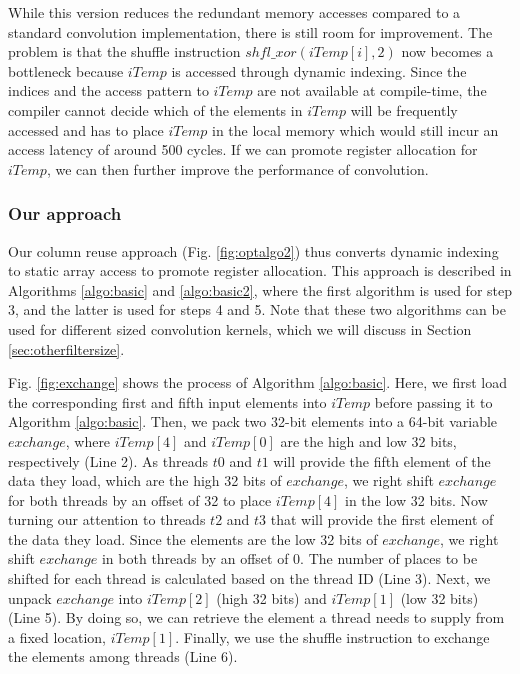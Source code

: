 While this version reduces the redundant memory accesses compared to a standard convolution implementation, there is still room for improvement.
The problem is that the shuffle instruction $shfl\_xor(iTemp[i],2)$ now becomes a bottleneck because $iTemp$ is accessed through dynamic indexing.
Since the indices and the access pattern to $iTemp$ are not available at compile-time, the compiler cannot decide which of the elements in $iTemp$ will be frequently accessed and has to place $iTemp$ in the local memory which would still incur an access latency of around 500 cycles.
If we can promote register allocation for $iTemp$, we can then further improve the performance of convolution.

\subsubsection{Our approach}
\label{sec:columnreuse}
Our column reuse approach (Fig. \ref {fig:optalgo2}) thus converts dynamic indexing to static array access to promote register
allocation. This approach is described in Algorithms \ref{algo:basic} and \ref{algo:basic2}, where the first algorithm is used for step 3,
and the latter is used for steps 4 and 5. Note that these two algorithms can be used for different sized convolution kernels, which we
will discuss in Section \ref {sec:otherfiltersize}.

Fig. \ref{fig:exchange} shows the process of Algorithm \ref{algo:basic}. Here, we first load the corresponding first and fifth input
elements into $iTemp$ before passing it to Algorithm \ref{algo:basic}. Then, we pack two 32-bit elements into a 64-bit variable $exchange$,
where $iTemp[4]$ and $iTemp[0]$ are the high and low 32 bits, respectively (Line 2). As threads $t0$ and $t1$ will provide the fifth
element of the data they load, which are the high 32 bits of $exchange$, we right shift $exchange$ for both threads by an offset of 32 to
place $iTemp[4]$ in the low 32 bits. Now turning our attention to threads $t2$ and $t3$ that will provide the first element of the data
they load. Since the elements are the low 32 bits of $exchange$, we right shift $exchange$ in both threads by an offset of 0. The number
of places to be shifted for each thread is calculated based on the thread ID (Line 3). Next, we unpack $exchange$ into $iTemp[2]$ (high 32
bits) and $iTemp[1]$ (low 32 bits) (Line 5). By doing so, we can retrieve the element a thread needs to supply from a fixed location,
$iTemp[1]$. Finally, we use the shuffle instruction to exchange the elements among threads (Line 6).

